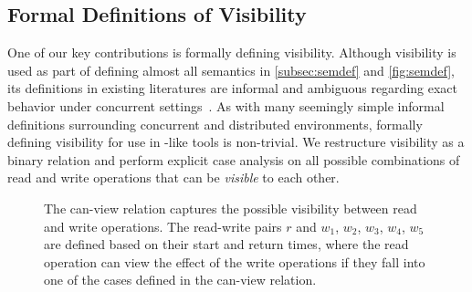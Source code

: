   \subsection{Formal Definitions of Visibility}
  \label{subsec:vis}
  One of our key contributions is formally defining visibility.
  Although visibility is used as part of defining almost all semantics in
  \cref{subsec:semdef} and \cref{fig:semdef}, its definitions in
  existing literatures are informal and ambiguous regarding exact
  behavior under concurrent
  settings~\cite{viotti2016consistency,viotti2016towards,zhang2018building,ferreira2023antipode}.
  As with many seemingly simple informal definitions surrounding
  concurrent and distributed environments, formally defining visibility
  for use in \sysname{}-like tools is non-trivial.
  We restructure visibility as a binary relation
  and perform explicit case analysis on all possible combinations of
  read and write operations that can be \textit{visible} to each other.

  \begin{figure}[tb]
    \centering
    \caption{The can-view relation captures the
      possible visibility between read and write operations. The
      read-write pairs $r$ and $w_1$, $w_2$, $w_3$, $w_4$, $w_5$ are
      defined based on their start and return times, where the read
      operation can view the effect of the write operations if they fall
    into one of the cases defined in the can-view relation.}
    \label{fig:can-view}
  \end{figure}

